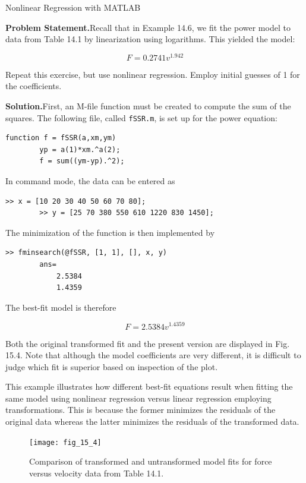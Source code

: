 \documentclass[../main.tex]{subfiles}
\begin{document}
\begin{example} Nonlinear Regression with MATLAB

    \textbf{Problem Statement.}\quad  Recall that in Example 14.6, we fit the power model to data from
	Table 14.1 by linearization using logarithms. This yielded the model:

	$$
		F = 0.2741 v ^{1.942}
	$$

	\noindent Repeat this exercise, but use nonlinear regression. Employ initial guesses of 1 for the
	coefficients.

	\noindent\textbf{Solution.}\quad First, an M-file function must be created to compute the sum of the squares.
	The following file, called \texttt{fSSR.m}, is set up for the power equation:

	\begin{lstlisting}[numbers=none]
		function f = fSSR(a,xm,ym)
		yp = a(1)*xm.^a(2);
		f = sum((ym-yp).^2);
	\end{lstlisting}

	\noindent In command mode, the data can be entered as

	\begin{lstlisting}[numbers=none]
		>> x = [10 20 30 40 50 60 70 80];
		>> y = [25 70 380 550 610 1220 830 1450];
	\end{lstlisting}

	\noindent The minimization of the function is then implemented by

	\begin{lstlisting}[numbers=none]
		>> fminsearch(@fSSR, [1, 1], [], x, y)
		ans=
			2.5384
			1.4359	
	\end{lstlisting}

	\noindent The best-fit model is therefore

	$$
		F = 2.5384 v^ {1.4359}
	$$

	Both the original transformed fit and the present version are displayed in Fig. 15.4.
	Note that although the model coefficients are very different, it is difficult to judge which fit
	is superior based on inspection of the plot.

	This example illustrates how different best-fit equations result when fitting the same
	model using nonlinear regression versus linear regression employing transformations. This
	is because the former minimizes the residuals of the original data whereas the latter minimizes the residuals of the transformed data.

	\begin{figure}[H]
		\centering
		\texttt{[image: fig\_15\_4]}
		\caption{\textsf{Comparison of transformed and untransformed model fits for force versus velocity data from
		Table 14.1.}}
		\label{fig:fig_15_4}
	\end{figure}
\end{example}
\end{document}
